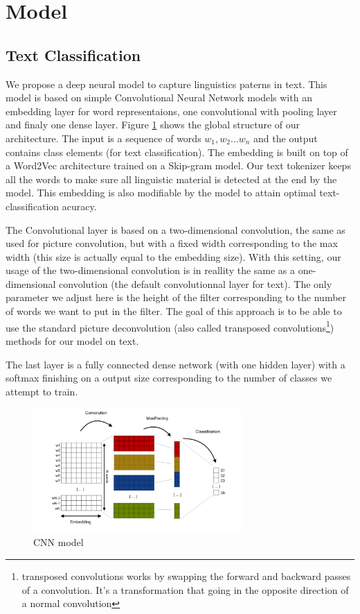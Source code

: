 \section{Model}

\subsection{Text Classification}

We propose a deep neural model to capture linguistics paterns in text. This model is based on simple Convolutional Neural Network models with an embedding layer for word representaions, one convolutional with pooling layer and finaly one dense layer. Figure \ref{cnn} shows the global structure of our architecture. The input is a sequence of words $ w_{1}, w_{2} ... w_{n} $ and the output contains class elements (for text classification). The embedding is built on top of a Word2Vec architecture trained on a Skip-gram model. Our text tokenizer keeps all the words to make sure all linguistic material is detected at the end by the model. This embedding is also modifiable by the model to attain optimal text-classification acuracy. 

The Convolutional layer is based on a two-dimensional convolution, the same as used for picture convolution, but with a fixed width corresponding to the max width (this size is actually equal to the embedding size). With this setting, our usage of the two-dimensional convolution is in reallity the same as a one-dimensional convolution (the default convolutionnal layer for text). The only parameter we adjust here is the height of the filter corresponding to the number of words we want to put in the filter. The goal of this approach is to be able to use the standard picture deconvolution (also called transposed convolutions\footnote{transposed convolutions works by swapping the forward and backward passes of a convolution. It's a transformation that going in the opposite direction of a normal convolution}) methods for our model on text.

The last layer is a fully connected dense network (with one hidden layer) with a softmax finishing on a output size corresponding to the number of classes we attempt to train.

\begin{figure}[h]
\begin{center}
\includegraphics[width=8cm]{img/model_classif.png}
\caption{CNN model}
\label{cnn}
\end{center}
\end{figure}

